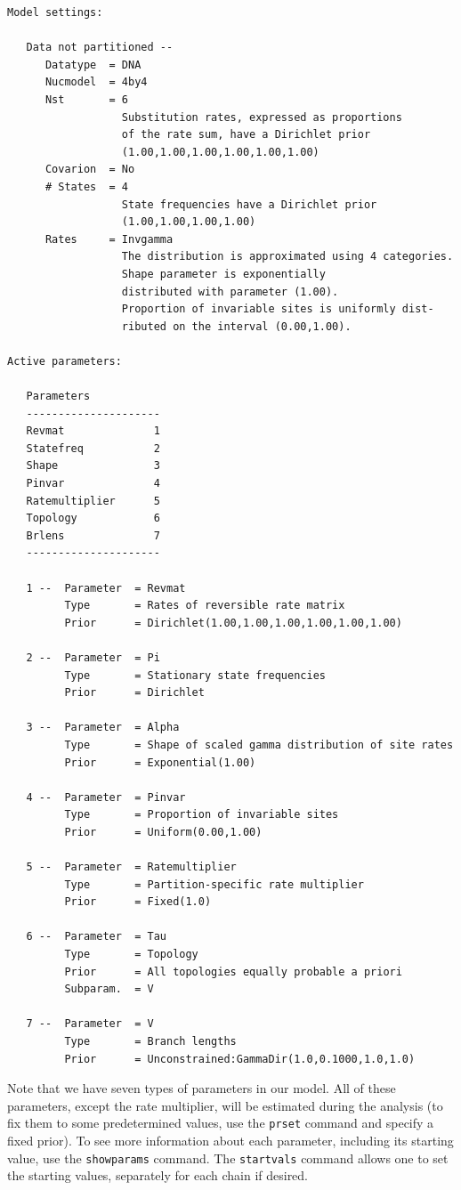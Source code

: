 \documentclass[12pt]{book}
\begin{document}
\begin{Verbatim}[fontsize=\footnotesize]
Model settings:

   Data not partitioned --
      Datatype  = DNA
      Nucmodel  = 4by4
      Nst       = 6
                  Substitution rates, expressed as proportions
                  of the rate sum, have a Dirichlet prior
                  (1.00,1.00,1.00,1.00,1.00,1.00)
      Covarion  = No
      # States  = 4
                  State frequencies have a Dirichlet prior
                  (1.00,1.00,1.00,1.00)
      Rates     = Invgamma
                  The distribution is approximated using 4 categories.
                  Shape parameter is exponentially
                  distributed with parameter (1.00).
                  Proportion of invariable sites is uniformly dist-
                  ributed on the interval (0.00,1.00).

Active parameters: 

   Parameters
   ---------------------
   Revmat              1
   Statefreq           2
   Shape               3
   Pinvar              4
   Ratemultiplier      5
   Topology            6
   Brlens              7
   ---------------------

   1 --  Parameter  = Revmat
         Type       = Rates of reversible rate matrix
         Prior      = Dirichlet(1.00,1.00,1.00,1.00,1.00,1.00)

   2 --  Parameter  = Pi
         Type       = Stationary state frequencies
         Prior      = Dirichlet

   3 --  Parameter  = Alpha
         Type       = Shape of scaled gamma distribution of site rates
         Prior      = Exponential(1.00)

   4 --  Parameter  = Pinvar
         Type       = Proportion of invariable sites
         Prior      = Uniform(0.00,1.00)

   5 --  Parameter  = Ratemultiplier
         Type       = Partition-specific rate multiplier
         Prior      = Fixed(1.0)

   6 --  Parameter  = Tau
         Type       = Topology
         Prior      = All topologies equally probable a priori
         Subparam.  = V

   7 --  Parameter  = V
         Type       = Branch lengths
         Prior      = Unconstrained:GammaDir(1.0,0.1000,1.0,1.0)
\end{Verbatim}

Note that we have seven types of parameters in our model. All of these parameters, except the rate
multiplier, will be estimated during the analysis (to fix them to some predetermined values, use
the \texttt{prset} command and specify a fixed prior). To see more information about each
parameter, including its starting value, use the \texttt{showparams} command. The
\texttt{startvals} command allows one to set the starting values, separately for each chain if
desired.
\end{document}
